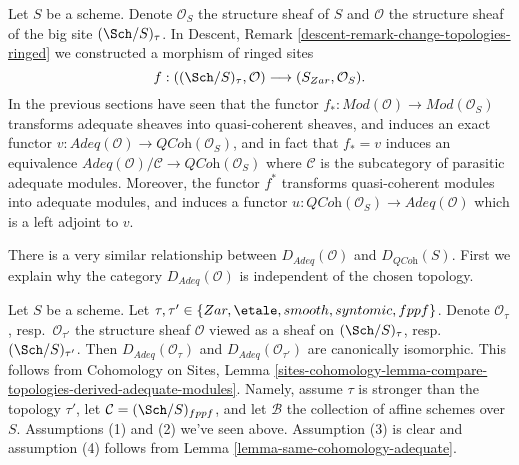 \noindent
Let $S$ be a scheme. Denote $\mathcal{O}_S$ the structure sheaf of $S$
and $\mathcal{O}$ the structure sheaf of the big site $(\Sch/S)_\tau$.
In
Descent, Remark \ref{descent-remark-change-topologies-ringed}
we constructed a morphism of ringed sites
\begin{equation}
\label{equation-compare-big-small}
f :
((\Sch/S)_\tau, \mathcal{O})
\longrightarrow
(S_{Zar}, \mathcal{O}_S).
\end{equation}
In the previous sections have seen that the functor
$f_* : \textit{Mod}(\mathcal{O}) \to \textit{Mod}(\mathcal{O}_S)$
transforms adequate sheaves into quasi-coherent sheaves, and
induces an exact functor
$v : \textit{Adeq}(\mathcal{O}) \to \textit{QCoh}(\mathcal{O}_S)$, and
in fact that $f_* = v$ induces an equivalence
$\textit{Adeq}(\mathcal{O})/\mathcal{C} \to \textit{QCoh}(\mathcal{O}_S)$
where $\mathcal{C}$ is the subcategory of parasitic adequate modules.
Moreover, the functor $f^*$ transforms quasi-coherent modules
into adequate modules, and induces a functor
$u : \textit{QCoh}(\mathcal{O}_S) \to \textit{Adeq}(\mathcal{O})$
which is a left adjoint to $v$.

\medskip\noindent
There is a very similar relationship between
$D_{\textit{Adeq}}(\mathcal{O})$ and $D_{\textit{QCoh}}(S)$.
First we explain why the category $D_{\textit{Adeq}}(\mathcal{O})$
is independent of the chosen topology.

\begin{remark}
\label{remark-D-adeq-independence-topology}
Let $S$ be a scheme.
Let $\tau, \tau' \in \{Zar, \etale, smooth, syntomic, fppf\}$.
Denote $\mathcal{O}_\tau$, resp.\ $\mathcal{O}_{\tau'}$
the structure sheaf $\mathcal{O}$ viewed as a sheaf on
$(\Sch/S)_\tau$, resp.\ $(\Sch/S)_{\tau'}$.
Then $D_{\textit{Adeq}}(\mathcal{O}_\tau)$ and
$D_{\textit{Adeq}}(\mathcal{O}_{\tau'})$ are canonically isomorphic.
This follows from
Cohomology on Sites, Lemma
\ref{sites-cohomology-lemma-compare-topologies-derived-adequate-modules}.
Namely, assume $\tau$ is stronger than the topology $\tau'$, let
$\mathcal{C} = (\Sch/S)_{fppf}$, and let $\mathcal{B}$ the collection
of affine schemes over $S$. Assumptions (1) and (2) we've seen above.
Assumption (3) is clear and assumption (4) follows from
Lemma \ref{lemma-same-cohomology-adequate}.
\end{remark}

